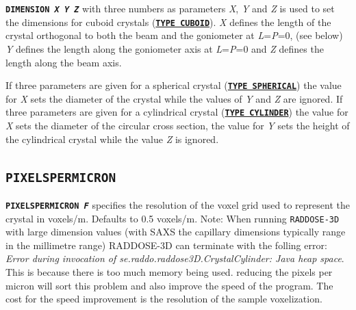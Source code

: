 \documentclass[a4paper]{article}
\newcommand{\RD}{\texttt{RADDOSE-3D}\xspace}
\newcommand{\Keyword}[1]{\texttt{\textbf{#1}}\xspace}
\begin{document}
\noindent \Keyword{DIMENSION \textit{X Y Z}} with three numbers as parameters \textit{X}, \textit{Y} and \textit{Z} is used to set the dimensions for cuboid crystals (\hyperref[crystaltype]{\Keyword{TYPE CUBOID}}).
\textit{X} defines the length of the crystal orthogonal to both the beam and the goniometer at \textit{L}=\textit{P}=0, (see below)
\textit{Y} defines the length along the goniometer axis at \textit{L}=\textit{P}=0 and
\textit{Z} defines the length along the beam axis.

If three parameters are given for a spherical crystal (\hyperref[crystaltype]{\Keyword{TYPE SPHERICAL}}) the value for \textit{X} sets the diameter of the crystal while the values of \textit{Y} and \textit{Z} are ignored.
If three parameters are given for a cylindrical crystal (\hyperref[crystaltype]{\Keyword{TYPE CYLINDER}}) the value for \textit{X} sets the diameter of the circular cross section, the value for \textit{Y} sets the height of the cylindrical crystal while the value \textit{Z} is ignored.

%
%
%
%
%
%
%


\subsection{\Keyword{PIXELSPERMICRON}}

\noindent \Keyword{PIXELSPERMICRON \textit{F}}
specifies the resolution of the voxel grid used to represent the crystal in voxels/\hbox{\textmu}m. Defaults to 0.5 voxels/\hbox{\textmu}m.
\newline
Note: When running \RD with large dimension values (with SAXS the capillary dimensions typically range in the millimetre range) RADDOSE-3D can terminate with the folling error:
\newline
\textit{Error during invocation of se.raddo.raddose3D.CrystalCylinder: Java heap space}.
\newline
This is because there is too much memory being used. reducing the pixels per micron will sort this problem and also improve the speed of the program. The cost for the speed improvement is the resolution of the sample voxelization.
\end{document}
